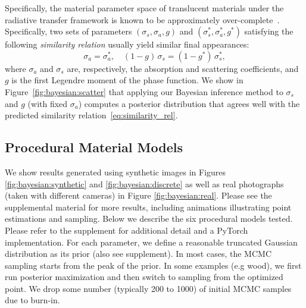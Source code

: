Specifically, the material parameter space of translucent materials under the radiative transfer framework \cite{chandrasekhar1960radiative} is known to be approximately over-complete~\cite{zhao2014high}.
Specifically, two sets of parameters $(\sigma_s, \sigma_a, g)$ and $(\sigma_s^*, \sigma_a^*, g^*)$ satisfying the following \emph{similarity relation} usually yield similar final appearances:
\begin{equation}
	\label{eq:similarity_rel}
	\sigma_a = \sigma_a^*, \quad (1 - g)\,\sigma_s = (1 - g^*)\,\sigma_s^*,
\end{equation}
where $\sigma_a$ and $\sigma_s$ are, respectively, the absorption and scattering coefficients, and $g$ is the first Legendre moment of the phase function.
We show in Figure~\ref{fig:bayesian:scatter} that applying our Bayesian inference method to $\sigma_s$ and $g$ (with fixed $\sigma_a$) computes a posterior distribution that agrees well with the predicted similarity relation~\eqref{eq:similarity_rel}.


\subsection{Procedural Material Models}
\label{ssec:proc_models}

We show results generated using synthetic images in Figures \ref{fig:bayesian:synthetic} and \ref{fig:bayesian:discrete} as well as real photographs (taken with different cameras) in Figure \ref{fig:bayesian:real}.
Please see the supplemental material for more results, including animations illustrating point estimations and sampling. Below we describe the six procedural models tested. Please refer to the supplement for additional detail and a \textsf{PyTorch} implementation. For each parameter, we define a reasonable truncated Gaussian distribution as its prior (also see supplement). In most cases, the MCMC sampling starts from the peak of the prior. In some examples (e.g wood), we first run posterior maximization and then switch to sampling from the optimized point. We drop some number (typically 200 to 1000) of initial MCMC samples due to burn-in.









